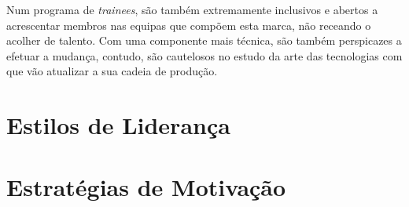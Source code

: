 Num programa de \textit{trainees}, são também extremamente inclusivos e abertos a acrescentar membros nas equipas que compõem esta marca, não receando o acolher de talento. Com uma componente mais técnica, são também perspicazes a efetuar a mudança, contudo, são cautelosos no estudo da arte das tecnologias com que vão atualizar a sua cadeia de produção. 

\section{Estilos de Liderança}
\section{Estratégias de Motivação}
